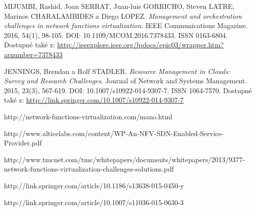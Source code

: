 \begin{thebibliography}{10}
MIJUMBI, Rashid, Joan SERRAT, Juan-luis GORRICHO, Steven LATRE, Marinos CHARALAMBIDES a Diego LOPEZ. \emph{Management and orchestration challenges in network functions virtualization}. IEEE Communications Magazine. 2016, 54(1), 98-105. DOI: 10.1109/MCOM.2016.7378433. ISSN 0163-6804. Dostupné také z: \url{http://ieeexplore.ieee.org/lpdocs/epic03/wrapper.htm?arnumber=7378433}

JENNINGS, Brendan a Rolf STADLER. \emph{Resource Management in Clouds: Survey and Research Challenges}. Journal of Network and Systems Management. 2015, 23(3), 567-619. DOI: 10.1007/s10922-014-9307-7. ISSN 1064-7570. Dostupné také z: \url{http://link.springer.com/10.1007/s10922-014-9307-7}


http://network-functions-virtualization.com/mano.html

http://www.alticelabs.com/content/WP-An-NFV-SDN-Enabled-Service-Provider.pdf

http://www.tmcnet.com/tmc/whitepapers/documents/whitepapers/2013/9377-network-functions-virtualization-challenges-solutions.pdf

http://link.springer.com/article/10.1186/s13638-015-0450-y

http://link.springer.com/article/10.1007/s11036-015-0630-3

\end{thebibliography}